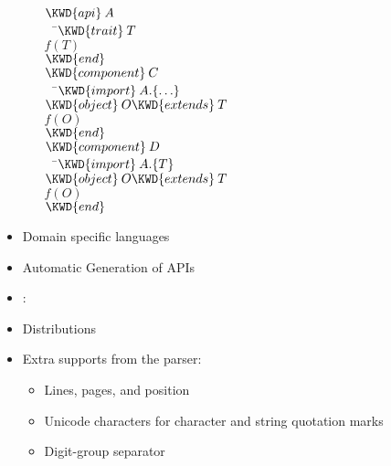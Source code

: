 \begin{itemize}
\begin{itemize}
\begin{Fortress}
\(\KWD{api}\:A\)\\
{\tt~~}\pushtabs\=\+\(  \KWD{trait}\:T\)\\
\(  f(T)\)\-\\\poptabs
\(\KWD{end}\)\\[4pt]
\(\KWD{component}\:C\)\\
{\tt~~}\pushtabs\=\+\(  \KWD{import}\:A.\{\ldots\}\)\\
\(  \KWD{object}\:O \KWD{extends}\:T\)\\
\(  f(O)\)\-\\\poptabs
\(\KWD{end}\)\\[4pt]
\(\KWD{component}\:D\)\\
{\tt~~}\pushtabs\=\+\(  \KWD{import}\:A.\{T\}\)\\
\(  \KWD{object}\:O \KWD{extends}\:T\)\\
\(  f(O)\)\-\\\poptabs
\(\KWD{end}\)
\end{Fortress}

  \end{itemize}

\item Domain specific languages

\item Automatic Generation of APIs

\item {}: 

\item Distributions

\item Extra supports from the parser:
  \begin{itemize}
    \item Lines, pages, and position

    \item Unicode characters for character and string quotation marks

    \item Digit-group separator


\end{itemize}
\end{itemize}
